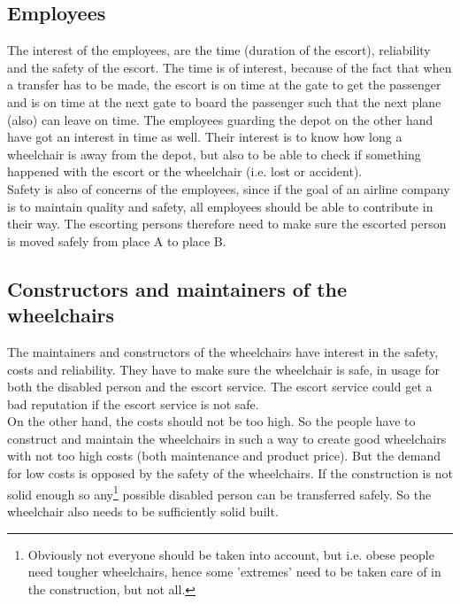 \documentclass[a4paper, 11pt, notitlepage]{report}
\begin{document}
\subsection{Employees}
The interest of the employees, are the time (duration of the escort), reliability and the safety of the escort. The time is of interest, because of the fact that when a transfer has to be made, the escort is on time at the gate to get the passenger and is on time at the next gate to board the passenger such that the next plane (also) can leave on time. The employees guarding the depot on the other hand have got an interest in time as well. Their interest is to know how long a wheelchair is away from the depot, but also to be able to check if something happened with the escort or the wheelchair (i.e. lost or accident). \\
Safety is also of concerns of the employees, since if the goal of an airline company is to maintain quality and safety, all employees should be able to contribute in their way. The escorting persons therefore need to make sure the escorted person is moved safely from place A to place B.
\subsection{Constructors and maintainers of the wheelchairs}
The maintainers and constructors of the wheelchairs have interest in the safety, costs and reliability. They have to make sure the wheelchair is safe,  in usage for both the disabled person and the escort service. The escort service could get a bad reputation if the escort service is not safe.\\
On the other hand, the costs should not be too high. So the people have to construct and maintain the wheelchairs in such a way to create good wheelchairs with not too high costs (both maintenance and product price). But the demand for low costs is opposed by the safety of the wheelchairs. If the construction is not solid enough so any\footnote{Obviously not everyone should be taken into account, but i.e. obese people need tougher wheelchairs, hence some 'extremes' need to be taken care of in the construction, but not all.} possible disabled person can be transferred safely. So the wheelchair also needs to be sufficiently solid built.
\end{document}
